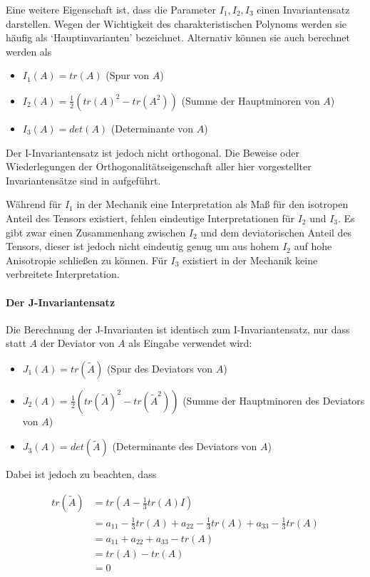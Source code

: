 \documentclass[a4paper,fontsize=12pt,toc=bib,halfparskip,ngerman]{scrartcl}
\begin{document}
Eine weitere Eigenschaft ist, dass die Parameter $I_1, I_2, I_3$ einen Invariantensatz darstellen. Wegen der Wichtigkeit des charakteristischen Polynoms werden sie h\"aufig als `Hauptinvarianten' bezeichnet. Alternativ k\"onnen sie auch berechnet werden als

\begin{itemize}
	\item $I_1(A) = tr(A)$ (Spur von $A$)
	\item $I_2(A) = \frac{1}{2}(tr(A)^2 - tr(A^2))$ (Summe der Hauptminoren von $A$)
	\item $I_3(A) = det(A)$ (Determinante von $A$)
\end{itemize}

Der I-Invariantensatz ist jedoch nicht orthogonal. Die Beweise oder Wiederlegungen der Orthogonalit\"atseigenschaft aller hier vorgestellter Invariantens\"atze sind in \cite[S.~144]{ennis2006orthogonal} aufgef\"uhrt.

W\"ahrend f\"ur $I_1$ in der Mechanik eine Interpretation als Ma{\ss} f\"ur den isotropen Anteil des Tensors existiert, fehlen eindeutige Interpretationen f\"ur $I_2$ und $I_3$. Es gibt zwar einen Zusammenhang zwischen $I_2$ und dem deviatorischen Anteil des Tensors, dieser ist jedoch nicht eindeutig genug um aus hohem $I_2$ auf hohe Anisotropie schlie{\ss}en zu k\"onnen. F\"ur $I_3$ existiert in der Mechanik keine verbreitete Interpretation. 

\paragraph{Der J-Invariantensatz}
 Die Berechnung der J-Invarianten ist identisch zum I-Invariantensatz, nur dass statt $A$ der Deviator von $A$ als Eingabe verwendet wird:

\begin{itemize}
	\item $J_1(A) = tr(\tilde{A})$ (Spur des Deviators von $A$)
	\item $J_2(A) = \frac{1}{2}(tr(\tilde{A})^2 - tr(\tilde{A}^2))$ (Summe der Hauptminoren des Deviators von $A$)
\item $J_3(A) = det(\tilde{A})$ (Determinante des Deviators von $A$)
\end{itemize}

Dabei ist jedoch zu beachten, dass

\begin{equation}
	\begin{split}
	tr(\tilde{A}) &= tr(A - \frac{1}{3}tr(A)I)\\
	&= a_{11} - \frac{1}{3} tr(A) + a_{22} - \frac{1}{3} tr(A) + a_{33} - \frac{1}{3} tr(A)\\
	&= a_{11} + a_{22} + a_{33} - tr(A)\\
	&= tr(A) - tr(A)\\
	&= 0
	\end{split}
\end{equation}
\end{document}
